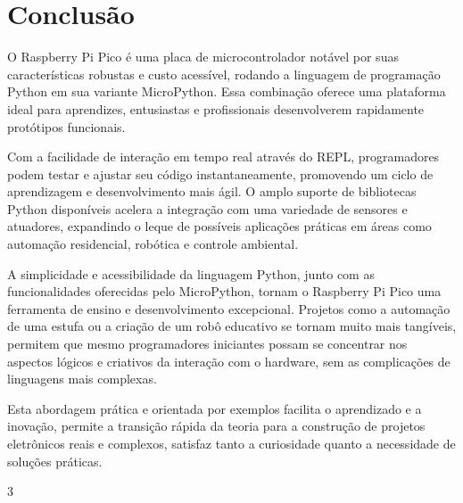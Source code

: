 \documentclass[a4paper,11pt]{article}
\begin{document}
\section{Conclusão}
O Raspberry Pi Pico é uma placa de microcontrolador notável por suas características robustas e custo acessível, rodando a linguagem de programação Python em sua variante MicroPython. Essa combinação oferece uma plataforma ideal para aprendizes, entusiastas e profissionais desenvolverem rapidamente protótipos funcionais. 

Com a facilidade de interação em tempo real através do REPL, programadores podem testar e ajustar seu código instantaneamente, promovendo um ciclo de aprendizagem e desenvolvimento mais ágil. O amplo suporte de bibliotecas Python disponíveis acelera a integração com uma variedade de sensores e atuadores, expandindo o leque de possíveis aplicações práticas em áreas como automação residencial, robótica e controle ambiental.

A simplicidade e acessibilidade da linguagem Python, junto com as funcionalidades oferecidas pelo MicroPython, tornam o Raspberry Pi Pico uma ferramenta de ensino e desenvolvimento excepcional. Projetos como a automação de uma estufa ou a criação de um robô educativo se tornam muito mais tangíveis, permitem que mesmo programadores iniciantes possam se concentrar nos aspectos lógicos e criativos da interação com o hardware, sem as complicações de linguagens mais complexas. 

Esta abordagem prática e orientada por exemplos facilita o aprendizado e a inovação, permite a transição rápida da teoria para a construção de projetos eletrônicos reais e complexos, satisfaz tanto a curiosidade quanto a necessidade de soluções práticas.



\begin{thebibliography}{3}
  
\end{thebibliography}
  
\end{document}

